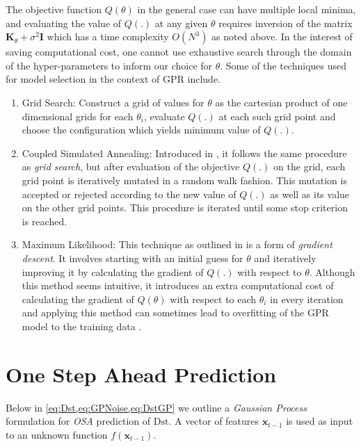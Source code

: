 The objective function $Q(\theta)$ in the general case can have multiple local minima, and 
evaluating the value of $Q(.)$ at any given $\theta$ requires inversion of the matrix 
$\mathbf{K}_\theta + \sigma^{2} \mathbf{I}$ which has a time complexity $O(N^3)$ as noted above. 
In the interest of saving computational cost, one cannot use exhaustive search through the domain 
of the hyper-parameters to inform our choice for $\theta$. Some of the techniques used for model 
selection in the context of GPR include.

\begin{enumerate}
\item Grid Search: Construct a grid of values for $\theta$ as the cartesian product of one 
      dimensional grids for each $\theta_i$, evaluate $Q(.)$ at each such grid point and choose the 
      configuration which yields minimum value of $Q(.)$.

\item Coupled Simulated Annealing: Introduced in \citet{Xavier-De-Souza2010}, it follows the same 
      procedure as \emph{grid search}, but after evaluation of the objective $Q(.)$ on the grid, 
      each grid point is iteratively mutated in a random walk fashion. This mutation is accepted or 
      rejected according to the new value of $Q(.)$ as well as its value on the other grid points. 
      This procedure is iterated until some stop criterion is reached.

\item Maximum Likelihood: This technique as outlined in \citet{Rasmussen:2005:GPM:1162254} is a 
      form of \emph{gradient descent}. It involves starting with an initial guess for $\theta$ and 
      iteratively improving it by calculating the gradient of $Q(.)$ with respect to $\theta$. 
      Although this method seems intuitive, it introduces an extra computational cost of 
      calculating the gradient of $Q(\theta)$ with respect to each $\theta_i$ in every iteration 
      and applying this method can sometimes lead to overfitting of the GPR model to the training 
      data \citet{Rasmussen:2005:GPM:1162254}.
\end{enumerate}

\section{One Step Ahead Prediction} \label{sec:osa}

Below in \cref{eq:Dst,eq:GPNoise,eq:DstGP} we outline a \emph{Gaussian Process} formulation for 
\emph{OSA} prediction of $ \mathrm{Dst}$. A vector of features $\mathbf{x}_{t-1}$ is used as input 
to an unknown function $f(\mathbf{x}_{t-1})$.

